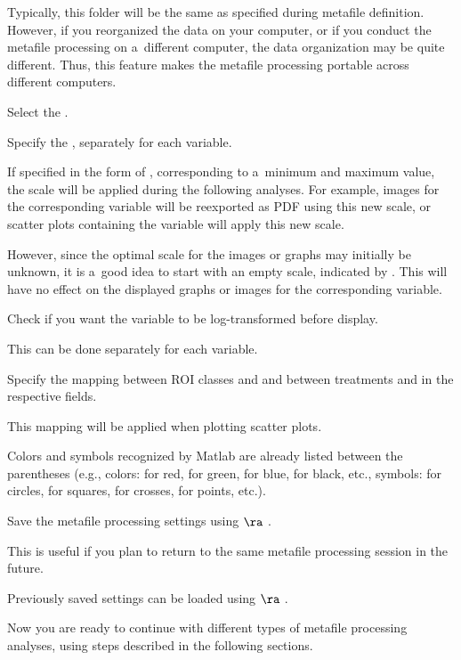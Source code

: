 \bul Typically, this folder will be the same as specified during metafile definition. However, if you reorganized the data on your computer, or if you conduct the metafile processing on a~different computer, the data organization may be quite different. Thus, this feature makes the metafile processing portable across different computers.

\s Select the .

\s Specify  the , separately for each variable.

\bul If specified in the form of , corresponding to a~minimum and maximum value, the scale will be applied during the following analyses. For example, images for the corresponding variable will be reexported as PDF using this new scale, or scatter plots containing the variable will apply this new scale.

\bul However, since the optimal scale for the images or graphs may initially be unknown, it is a~good idea to start with an empty scale, indicated by \ttt{[]}. This will have no effect on the displayed graphs or images for the corresponding variable.

\s Check  if you want the variable to be log-transformed before display.

\bul This can be done separately for each variable.

\s Specify the mapping between ROI classes and  and between treatments and  in the respective fields. 

\bul This mapping will be applied when plotting scatter plots.

\bul Colors and symbols recognized by Matlab are already listed between the parentheses (e.g., colors:  for red,  for green,  for blue,  for black, etc., symbols:  for circles,  for squares,  for crosses,  for points, etc.).

\s Save the metafile processing settings using  $\ra$ .

\bul This is useful if you plan to return to the same metafile processing session in the future.

\bul Previously saved settings can be loaded using  $\ra$ .

\bul Now you are ready to continue with different types of metafile processing analyses, using steps described in the following sections.

